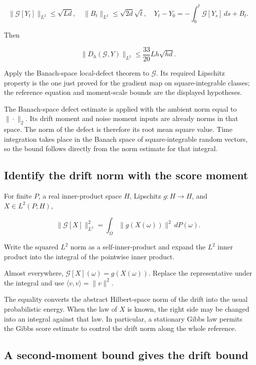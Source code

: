 \documentclass[11pt,a4paper]{article}
\begin{document}
\[\|\mathcal G[Y_t]\|_{L^2}\le\sqrt{Ld},\quad\|B_t\|_{L^2}\le\sqrt{2d}\sqrt t,\quad Y_t-Y_0=-\int_0^t\mathcal G[Y_s]\,ds+B_t.\]

Then

\[\|D_h(\mathcal G,Y)\|_{L^2}\le\frac{33}{20}Lh\sqrt{hd}.\]

Apply the Banach-space local-defect theorem to \(\mathcal G\). Its required Lipschitz property is the one just proved for the gradient map on square-integrable classes; the reference equation and moment-scale bounds are the displayed hypotheses.



The Banach-space defect estimate is applied with the ambient norm equal to \(\|\cdot\|_2\). Its drift moment and noise moment inputs are already norms in that space. The norm of the defect is therefore its root mean square value. Time integration takes place in the Banach space of square-integrable random vectors, so the bound follows directly from the norm estimate for that integral.


\subsection{\texorpdfstring{Identify the drift norm with the score moment}{Identify the drift norm with the score moment}}


For finite \(P\), a real inner-product space \(H\), Lipschitz \(g:H\to H\), and \(X\in L^2(P;H)\),

\[\|\mathcal G[X]\|_{L^2}^2=\int_\Omega\|g(X(\omega))\|^2\,dP(\omega).\]

Write the squared \(L^2\) norm as a self-inner-product and expand the \(L^2\) inner product into the integral of the pointwise inner product.



Almost everywhere, \(\mathcal G[X](\omega)=g(X(\omega))\). Replace the representative under the integral and use \(\langle v,v\rangle=\|v\|^2\).



The equality converts the abstract Hilbert-space norm of the drift into the usual probabilistic energy. When the law of \(X\) is known, the right side may be changed into an integral against that law. In particular, a stationary Gibbs law permits the Gibbs score estimate to control the drift norm along the whole reference.


\subsection{\texorpdfstring{A second-moment bound gives the drift bound}{A second-moment bound gives the drift bound}}
\end{document}
